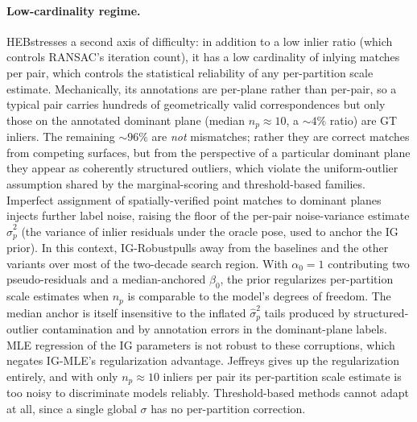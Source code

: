 \documentclass{article}
\newcommand{\mname}[1]{\texorpdfstring{#1\xspace}{#1}}
\newcommand{\ransac}{\mname{RANSAC}}
\newcommand{\igmle}{\mname{IG-MLE}}
\newcommand{\igrobust}{\mname{IG-Robust}}
\newcommand{\heb}{\mname{HEB}}
\begin{document}
\paragraph{Low-cardinality regime.}
\heb stresses a second axis of difficulty: in addition to a
low inlier ratio (which controls \ransac's iteration count),
it has a low cardinality of inlying matches per pair, which
controls the statistical reliability of any per-partition
scale estimate.  Mechanically, its annotations are per-plane
rather than per-pair, so a typical pair carries hundreds of
geometrically valid correspondences but only those on the
annotated dominant plane (median $n_p \approx 10$, a
${\sim}4\%$ ratio) are GT inliers.  The remaining ${\sim}96\%$ are \emph{not}
mismatches; rather they are correct matches from competing
surfaces, but from the perspective of a particular dominant
plane they appear as coherently structured outliers, which
violate the uniform-outlier assumption shared by the
marginal-scoring and threshold-based families.  Imperfect assignment of spatially-verified point matches to
dominant planes injects further label noise, raising the
floor of the per-pair noise-variance estimate
$\hat\sigma^2_p$ (the variance of inlier residuals under the
oracle pose, used to anchor the IG prior).  In this context, \igrobust pulls away from the baselines and
the other variants over most of the two-decade
search region.  With $\alpha_0 = 1$ contributing two
pseudo-residuals and a median-anchored $\beta_0$, the prior
regularizes per-partition scale estimates when $n_p$ is
comparable to the model's degrees of freedom.  The median
anchor is itself insensitive to the inflated $\hat\sigma^2_p$
tails produced by structured-outlier contamination and by
annotation errors in the dominant-plane labels.  MLE regression of the IG parameters is not robust to these
corruptions, which negates \igmle's regularization advantage.
Jeffreys gives up the regularization entirely, and with only
$n_p \approx 10$ inliers per pair its
per-partition scale estimate is too noisy to discriminate
models reliably.  Threshold-based methods cannot adapt at
all, since a single global $\sigma$ has no per-partition
correction.
\end{document}
